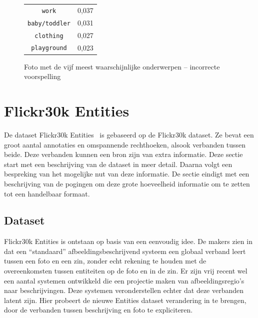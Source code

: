 \begin{figure}[h]
\begin{minipage}[t]{.5\textwidth}
\begin{tabular}{cl}
            \texttt{work}                   & 0,037 \\
            \texttt{baby/toddler}                 & 0,031 \\
            \texttt{clothing}           & 0,027 \\
            \texttt{playground}        & 0,023\\
            \hline
        \end{tabular}
    \end{minipage}
    \caption{Foto met de vijf meest waarschijnlijke onderwerpen -- incorrecte voorspelling}
    \label{fig:wrongldalearning}
\end{figure}


\section{Flickr30k Entities}
De dataset Flickr30k Entities~\cite{Plummer2015} is gebaseerd op de Flickr30k dataset. Ze bevat een groot aantal annotaties en omspannende rechthoeken, alsook verbanden tussen beide. Deze verbanden kunnen een bron zijn van extra informatie. Deze sectie start met een beschrijving van de dataset in meer detail. Daarna volgt een bespreking van het mogelijke nut van deze informatie. De sectie eindigt met een beschrijving van de pogingen om deze grote hoeveelheid informatie om te zetten tot een handelbaar formaat. 

\subsection{Dataset}
\label{sub:Dataset}
Flickr30k Entities is ontstaan op basis van een eenvoudig idee. De makers zien in dat een ``standaard'' afbeeldingsbeschrijvend systeem een globaal verband leert tussen een foto en een zin, zonder echt rekening te houden met de overeenkomsten tussen entiteiten op de foto en in de zin. Er zijn vrij recent wel een aantal systemen ontwikkeld die een projectie maken van afbeeldingsregio's naar beschrijvingen. Deze systemen veronderstellen echter dat deze verbanden latent zijn. Hier probeert de nieuwe Entities dataset verandering in te brengen, door de verbanden tussen beschrijving en foto te expliciteren.

